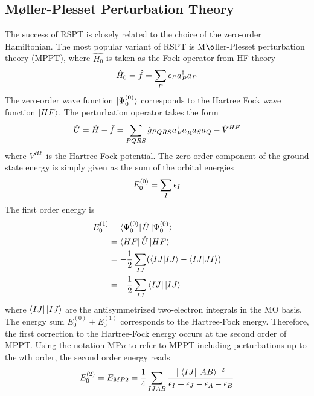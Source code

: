 \subsection{M{\o}ller-Plesset Perturbation Theory}

The success of RSPT is closely related to the choice of the zero-order Hamiltonian. The most popular variant of RSPT is M${\o}$ller-Plesset perturbation theory (MPPT), where $\hat{H_0}$ is taken as the Fock operator from HF theory
\begin{equation}
\hat{H}_0 = \hat{f} = \sum_P \epsilon_P a^{\dagger}_P a_P
\end{equation}
\noindent The zero-order wave function $\ket{\smash{\Psi_0^{(0)}}}$ corresponds to the Hartree Fock wave function $\ket{\smash{HF}}$. The perturbation operator takes the form
\begin{equation}
\hat{U} = \hat{H} - \hat{f} = \sum_{PQRS} \hat{g}_{PQRS} a^{\dagger}_P a^{\dagger}_R a_S a_Q - \hat{V}^{HF} 
\end{equation}
\noindent where $V^{HF}$ is the Hartree-Fock potential. The zero-order component of the ground state energy is simply given as the sum of the orbital energies
\begin{equation}
E_0^{(0)} = \sum_I \epsilon_I
\end{equation}
\noindent The first order energy is
\begin{equation}
\begin{split}
E_0^{(1)} &= \sbra{\Psi_0^{(0)}} \hat{U} \sket{\Psi_0^{(0)}} \\
&= \sbra{HF}\hat{U}\sket{HF} \\
&= -\frac{1}{2} \sum_{IJ} ( \sbraket{IJ}{IJ} - \sbraket{IJ}{JI} ) \\
&= -\frac{1}{2} \sum_{IJ} \sbra{IJ}\sket{IJ} 
\end{split}
\end{equation}
\noindent where $\sbra{IJ}\sket{IJ}$ are the antisymmetrized two-electron integrals in the MO basis. The energy sum $E_0^{(0)} + E_0^{(1)}$ corresponds to the Hartree-Fock energy. Therefore, the first correction to the Hartree-Fock energy occurs at the second order of MPPT. Using the notation MP$n$ to refer to MPPT including perturbations up to the $n$th order, the second order energy reads
\begin{equation}
\begin{split}
E_0^{(2)} = E_{MP2} = \frac{1}{4} \sum_{IJAB} \frac{\mid \sbra{IJ}\sket{AB}\mid^2}{\eps_I + \eps_J - \eps_A - \eps_B}
\end{split} 
\label{eq:UMP2}
\end{equation}
